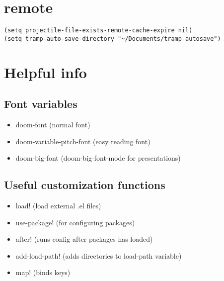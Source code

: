 \documentclass[11pt]{article}
\begin{document}
\section*{remote}
\label{sec:org02c0152}
\begin{verbatim}
(setq projectile-file-exists-remote-cache-expire nil)
(setq tramp-auto-save-directory "~/Documents/tramp-autosave")
\end{verbatim}

\section*{Helpful info}
\label{sec:org85917c5}
\subsection*{Font variables}
\label{sec:orgb01dd28}
\begin{itemize}
\item doom-font (normal font)
\item doom-variable-pitch-font (easy reading font)
\item doom-big-font (doom-big-font-mode for presentations)
\end{itemize}
\subsection*{Useful customization functions}
\label{sec:orgbe54749}
\begin{itemize}
\item load! (load external .el files)
\item use-package! (for configuring packages)
\item after! (runs config after packages has loaded)
\item add-load-path! (adds directories to load-path variable)
\item map! (binds keys)
\end{itemize}
\end{document}
